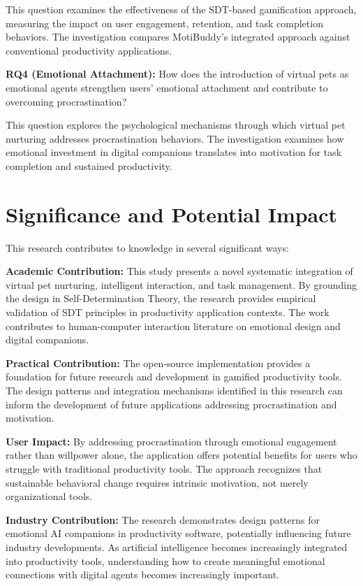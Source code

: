 This question examines the effectiveness of the SDT-based gamification approach, measuring the impact on user engagement, retention, and task completion behaviors. The investigation compares MotiBuddy's integrated approach against conventional productivity applications.

\textbf{RQ4 (Emotional Attachment):} How does the introduction of virtual pets as emotional agents strengthen users' emotional attachment and contribute to overcoming procrastination?

This question explores the psychological mechanisms through which virtual pet nurturing addresses procrastination behaviors. The investigation examines how emotional investment in digital companions translates into motivation for task completion and sustained productivity.

\section{Significance and Potential Impact}
\label{sec:significance}

This research contributes to knowledge in several significant ways:

\textbf{Academic Contribution:} This study presents a novel systematic integration of virtual pet nurturing, intelligent interaction, and task management. By grounding the design in Self-Determination Theory, the research provides empirical validation of SDT principles in productivity application contexts. The work contributes to human-computer interaction literature on emotional design and digital companions.

\textbf{Practical Contribution:} The open-source implementation provides a foundation for future research and development in gamified productivity tools. The design patterns and integration mechanisms identified in this research can inform the development of future applications addressing procrastination and motivation.

\textbf{User Impact:} By addressing procrastination through emotional engagement rather than willpower alone, the application offers potential benefits for users who struggle with traditional productivity tools. The approach recognizes that sustainable behavioral change requires intrinsic motivation, not merely organizational tools.

\textbf{Industry Contribution:} The research demonstrates design patterns for emotional AI companions in productivity software, potentially influencing future industry developments. As artificial intelligence becomes increasingly integrated into productivity tools, understanding how to create meaningful emotional connections with digital agents becomes increasingly important.

